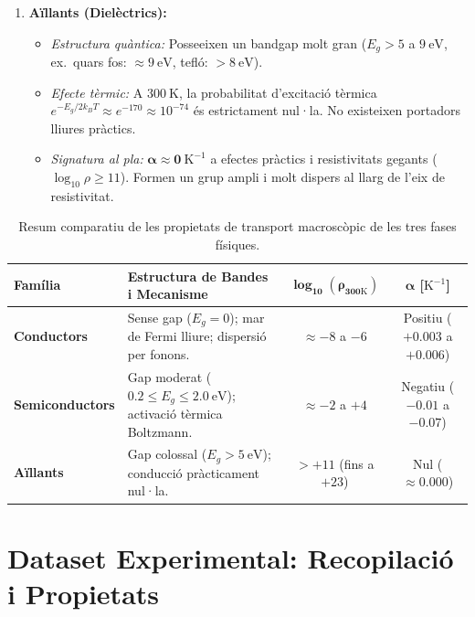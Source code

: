 \documentclass[a4paper,11pt]{article}
\begin{document}
\begin{enumerate}
    \item \textbf{Aïllants (Dielèctrics):}
    \begin{itemize}
        \item \emph{Estructura quàntica:} Posseeixen un bandgap molt gran ($E_g > 5$ a $9\ \text{eV}$, ex.\ quars fos: $\approx 9\ \text{eV}$, tefló: $> 8\ \text{eV}$).
        \item \emph{Efecte tèrmic:} A $300\ \text{K}$, la probabilitat d'excitació tèrmica $e^{-E_g / 2k_BT} \approx e^{-170} \approx 10^{-74}$ és estrictament nul·la. No existeixen portadors lliures pràctics.
        \item \emph{Signatura al pla:} $\mathbf{\alpha \approx 0}\ \text{K}^{-1}$ a efectes pràctics i resistivitats gegants ($\log_{10}\rho \ge 11$). Formen un grup ampli i molt dispers al llarg de l'eix de resistivitat.
    \end{itemize}
\end{enumerate}

\begin{table}[H]
\centering
\small
\begin{tabularx}{\textwidth}{@{}l>{\raggedright\arraybackslash}Xcc@{}}
\toprule
\textbf{Família} & \textbf{Estructura de Bandes i Mecanisme} & $\mathbf{\log_{10}(\rho_{300\mathrm{K}})}$ & $\mathbf{\alpha}$ [$\text{K}^{-1}$] \\
\midrule
\textbf{Conductors} & Sense gap ($E_g = 0$); mar de Fermi lliure; dispersió per fonons. & $\approx -8$ a $-6$ & Positiu ($+0.003$ a $+0.006$) \\
\textbf{Semiconductors} & Gap moderat ($0.2 \le E_g \le 2.0\ \text{eV}$); activació tèrmica Boltzmann. & $\approx -2$ a $+4$ & Negatiu ($-0.01$ a $-0.07$) \\
\textbf{Aïllants} & Gap colossal ($E_g > 5\ \text{eV}$); conducció pràcticament nul·la. & $> +11$ (fins a $+23$) & Nul ($\approx 0.000$) \\
\bottomrule
\end{tabularx}
\caption{Resum comparatiu de les propietats de transport macroscòpic de les tres fases físiques.}
\label{tab:comparativa_familias}
\end{table}

\section{Dataset Experimental: Recopilació i Propietats}
\end{document}
